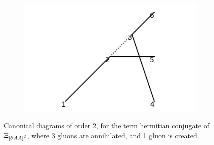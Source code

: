 \documentclass[11pt,a4paper,twoside,pdf]{article}
\numberwithin{equation}{section}
\begin{document}
\begin{figure}[h!]
\begin{subfigure}[t]{0.33\textwidth}
        \centering
        \includegraphics[width=\textwidth]{plots/canonical/order2/11.png}
        \caption{ }
    \end{subfigure}
    \caption{Canonical diagrams of order 2, for the term hermitian conjugate of 
    $\Xi_{\left[ \partial AA \right]^2}$, where 3 gluons are annihilated, and
    1 gluon is created.}
    \label{fig:cannonical2_3to1}
\end{figure}
\end{document}
